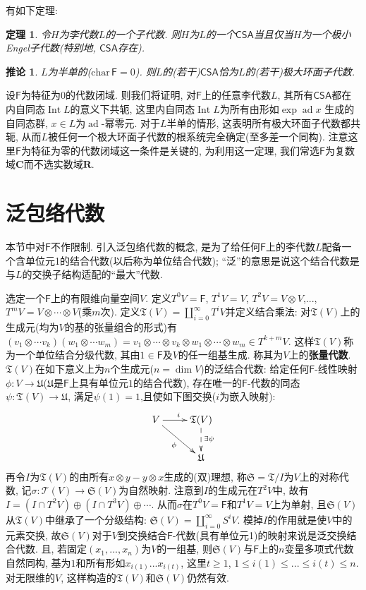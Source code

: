 \documentclass{ctexart}%
\newtheorem{theorem}{定理}
\newtheorem{corollary}{推论}
\theoremstyle{definition}
\theoremstyle{remark}
\DeclareMathOperator{\ad}{ad}
\DeclareMathOperator{\Int}{Int}
\begin{document}
有如下定理:
\begin{theorem}
令$H$为李代数$L$的一个子代数. 则$H$为$L$的一个$\mathsf{CSA}$当且仅当$H$为一个极小Engel子代数(特别地, $\mathsf{CSA}$存在).
\end{theorem}

\begin{corollary}
$L$为半单的($\mathrm{char}\,\mathsf{F}=0$). 则$L$的(若干)$\mathsf{CSA}$恰为$L$的(若干)极大环面子代数.
\end{corollary}

设$\mathsf{F}$为特征为0的代数闭域. 则我们将证明, 对$\mathsf{F}$上的任意李代数$L$, 其所有$\mathsf{CSA}$都在内自同态$\Int L$的意义下共轭, 这里内自同态$\Int L$为所有由形如$\exp \ad x$ 生成的自同态群, $x\in L$为$\ad$-幂零元. 对于$L$半单的情形, 这表明所有极大环面子代数都共轭, 从而$L$被任何一个极大环面子代数的根系统完全确定(至多差一个同构). 注意这里$\mathsf{F}$为特征为零的代数闭域这一条件是关键的, 为利用这一定理, 我们常选$\mathsf{F}$为复数域$\mathbf{C}$而不选实数域$\mathbf{R}$.

\section{泛包络代数}

本节中对$\mathsf{F}$不作限制. 引入泛包络代数的概念, 是为了给任何$\mathsf{F}$上的李代数$L$配备一个含单位元1的结合代数(以后称为单位结合代数); ``泛''的意思是说这个结合代数是与$L$的交换子结构适配的``最大''代数.

选定一个$\mathsf{F}$上的有限维向量空间$V$. 定义$T^0V=\mathsf{F}$, $T^1V=V$, $T^2V=V\otimes V$,...,$T^mV= V\otimes\cdots\otimes V$(乘$m$次). 定义$\mathfrak{T}(V)=\coprod_{i=0}^\infty T^iV$并定义结合乘法: 对$\mathfrak{T}(V)$上的生成元(均为$V$的基的张量组合的形式)有$(v_1\otimes \cdots v_k)(w_1\otimes\cdots w_m) = v_1\otimes\cdots\otimes v_k \otimes w_1\otimes\cdots \otimes w_m\in T^{k+m}V$. 这样$\mathfrak{T}(V)$称为一个单位结合分级代数, 其由$1\in\mathsf{F}$及$V$的任一组基生成. 称其为$V$上的\textbf{张量代数}. $\mathfrak{T}(V)$在如下意义上为$n$个生成元($n=\dim V$)的泛结合代数: 给定任何$\mathsf{F}$-线性映射$\phi\colon V\rightarrow \mathfrak{U}$($\mathfrak{U}$是$\mathsf{F}$上具有单位元$1$的结合代数), 存在唯一的$\mathsf{F}$-代数的同态$\psi\colon \mathfrak{T}(V)\rightarrow \mathfrak{U}$, 满足$\psi(1)=1$,且使如下图交换($i$为嵌入映射):
$$
\xymatrix{ V\ar[dr]_\phi\ar[r]^i& \mathfrak{T}(V)\ar@{-->}[d]^{\exists \psi}\\
 & \mathfrak{U}}
$$
再令$I$为$\mathfrak{T}(V)$的由所有$x\otimes y-y\otimes x$生成的(双)理想, 称$\mathfrak{S}=\mathfrak{T}/I$为$V$上的对称代数, 记$\sigma\colon\mathcal{T}(V)\rightarrow\mathfrak{S}(V)$为自然映射. 注意到$I$的生成元在$T^2V$中, 故有$I=(I\cap T^2V)\oplus(I\cap T^3V)\oplus\cdots$. 从而$\sigma$在$T^0V=\mathsf{F}$和$T^1V=V$上为单射, 且$\mathfrak{S}(V)$从$\mathfrak{T}(V)$中继承了一个分级结构: $\mathfrak{S}(V)=\coprod_{i=0}^\infty S^iV$. 模掉$I$的作用就是使$V$中的元素交换, 故$\mathfrak{S}(V)$对于$V$到交换结合$\mathsf{F}$-代数(具有单位元1)的映射来说是泛交换结合代数. 且, 若固定$(x_1,...,x_n)$为$V$的一组基, 则$\mathfrak{S}(V)$与$\mathsf{F}$上的$n$变量多项式代数自然同构, 基为$1$和所有形如$x_{i(1)}...x_{i(t)}$, 这里$t\geq 1$, $1\leq i(1)\leq ...\leq i(t)\leq n$. 对无限维的$V$, 这样构造的$\mathfrak{T}(V)$和$\mathfrak{S}(V)$仍然有效.
\end{document}
